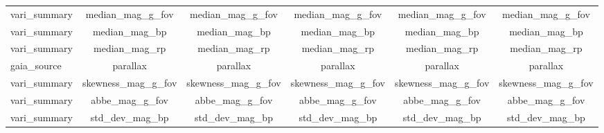 \documentclass[12pt,a4paper]{article}
\begin{document}
\begin{table}[h]
\begin{subtable}[h]{0.45\textwidth}
\begin{tabular}{lccccc}
\multicolumn{1}{l|}{vari\_summary}            & median\_mag\_g\_fov                                                                & median\_mag\_g\_fov                                                                &       median\_mag\_g\_fov                           &     median\_mag\_g\_fov                               &       median\_mag\_g\_fov                 \\
\multicolumn{1}{l|}{vari\_summary}            & median\_mag\_bp                                                                    & median\_mag\_bp                                                                    &      median\_mag\_bp                               &      median\_mag\_bp                                 &     median\_mag\_bp                      \\
\multicolumn{1}{l|}{vari\_summary}            & median\_mag\_rp                                                                    & median\_mag\_rp                                                                    &       median\_mag\_rp                           &       median\_mag\_rp                             &     median\_mag\_rp                   \\
\multicolumn{1}{l|}{gaia\_source}             & parallax                                                                           & parallax                                                                           &                                parallax    &        parallax                              &   parallax                       \\
\multicolumn{1}{l|}{vari\_summary}            & skewness\_mag\_g\_fov                                                              & skewness\_mag\_g\_fov                                                              &   skewness\_mag\_g\_fov                               &       skewness\_mag\_g\_fov                             &    skewness\_mag\_g\_fov                    \\
\multicolumn{1}{l|}{vari\_summary}            & abbe\_mag\_g\_fov                                                                  & abbe\_mag\_g\_fov                                                                  &        abbe\_mag\_g\_fov                          &   abbe\_mag\_g\_fov                                 &      abbe\_mag\_g\_fov                  \\
\multicolumn{1}{l|}{vari\_summary}            & std\_dev\_mag\_bp                                                                  & std\_dev\_mag\_bp                                                                  &         std\_dev\_mag\_bp                           &        std\_dev\_mag\_bp                              &      std\_dev\_mag\_bp                    \\

\end{tabular}
\end{subtable}
\end{table}
\end{document}
